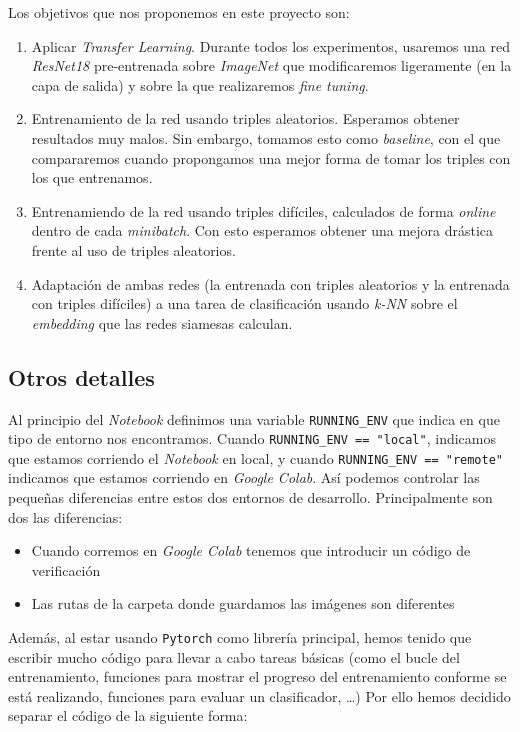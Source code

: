 \documentclass[11pt]{article}
\begin{document}
Los objetivos que nos proponemos en este proyecto son: 

\begin{enumerate}
  \item Aplicar \emph{Transfer Learning}. Durante todos los experimentos, usaremos una red \emph{ResNet18} pre-entrenada sobre \emph{ImageNet} que modificaremos ligeramente (en la capa de salida) y sobre la que realizaremos \emph{fine tuning}.
  \item Entrenamiento de la red usando triples aleatorios. Esperamos obtener resultados muy malos. Sin embargo, tomamos esto como \emph{baseline}, con el que compararemos cuando propongamos una mejor forma de tomar los triples con los que entrenamos.
  \item Entrenamiendo de la red usando triples difíciles, calculados de forma \emph{online} dentro de cada \emph{minibatch}. Con esto esperamos obtener una mejora drástica frente al uso de triples aleatorios.
  \item Adaptación de ambas redes (la entrenada con triples aleatorios y la entrenada con triples difíciles) a una tarea de clasificación usando \emph{k-NN} sobre el \emph{embedding} que las redes siamesas calculan.
\end{enumerate}

\subsection{Otros detalles}

Al principio del \emph{Notebook} definimos una variable \lstinline{RUNNING_ENV} que indica en que tipo de entorno nos encontramos. Cuando \lstinline{RUNNING_ENV == "local"}, indicamos que estamos corriendo el \emph{Notebook} en local, y cuando \lstinline{RUNNING_ENV == "remote"} indicamos que estamos corriendo en \emph{Google Colab}. Así podemos controlar las pequeñas diferencias entre estos dos entornos de desarrollo. Principalmente son dos las diferencias:

\begin{itemize}
    \item Cuando corremos en \emph{Google Colab} tenemos que introducir un código de verificación
    \item Las rutas de la carpeta donde guardamos las imágenes son diferentes
\end{itemize}

Además, al estar usando \lstinline{Pytorch} como librería principal, hemos tenido que escribir mucho código para llevar a cabo tareas básicas (como el bucle del entrenamiento, funciones para mostrar el progreso del entrenamiento conforme se está realizando, funciones para evaluar un clasificador, \ldots) Por ello hemos decidido separar el código de la siguiente forma:
\end{document}
